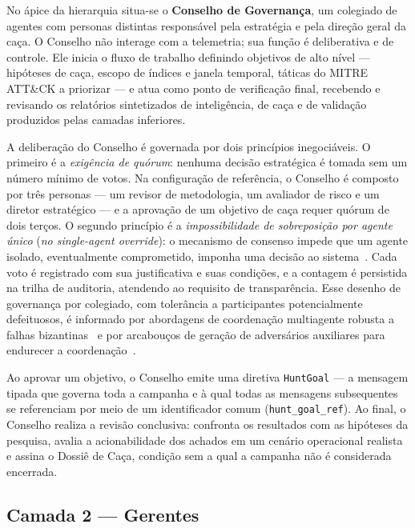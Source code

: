 No ápice da hierarquia situa-se o \textbf{Conselho de Governança}, um colegiado de
agentes com personas distintas responsável pela estratégia e pela direção geral
da caça. O Conselho não interage com a telemetria; sua função é deliberativa e de
controle. Ele inicia o fluxo de trabalho definindo objetivos de alto nível —
hipóteses de caça, escopo de índices e janela temporal, táticas do MITRE ATT\&CK
a priorizar — e atua como ponto de verificação final, recebendo e revisando os
relatórios sintetizados de inteligência, de caça e de validação produzidos pelas
camadas inferiores.

A deliberação do Conselho é governada por dois princípios inegociáveis. O
primeiro é a \emph{exigência de quórum}: nenhuma decisão estratégica é tomada sem
um número mínimo de votos. Na configuração de referência, o Conselho é composto
por três personas — um revisor de metodologia, um avaliador de risco e um diretor
estratégico — e a aprovação de um objetivo de caça requer quórum de dois terços.
O segundo princípio é a \emph{impossibilidade de sobreposição por agente único}
(\emph{no single-agent override}): o mecanismo de consenso impede que um agente
isolado, eventualmente comprometido, imponha uma decisão ao
sistema~\cite{huang2024resilience}. Cada voto é
registrado com sua justificativa e suas condições, e a contagem é persistida na
trilha de auditoria, atendendo ao requisito de transparência. Esse desenho de
governança por colegiado, com tolerância a participantes potencialmente
defeituosos, é informado por abordagens de coordenação multiagente robusta a
falhas bizantinas~\cite{doe2023emergent} e por arcabouços de geração de
adversários auxiliares para endurecer a
coordenação~\cite{Yuan_Zhang_Xue_Yin_Chen_Guan_Li_Qian_Yu_2023}.

Ao aprovar um objetivo, o Conselho emite uma diretiva \texttt{HuntGoal} — a
mensagem tipada que governa toda a campanha e à qual todas as mensagens
subsequentes se referenciam por meio de um identificador comum
(\texttt{hunt\_goal\_ref}). Ao final, o Conselho realiza a revisão conclusiva:
confronta os resultados com as hipóteses da pesquisa, avalia a acionabilidade dos
achados em um cenário operacional realista e assina o Dossiê de Caça, condição
sem a qual a campanha não é considerada encerrada.

\subsection{Camada 2 --- Gerentes}
\label{sec:arq-managers}

